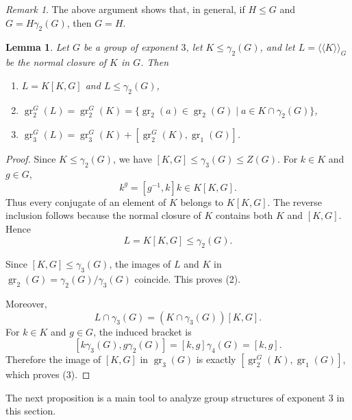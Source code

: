 \documentclass[11pt,reqno]{article}
\newtheorem{lemma}[theorem]{Lemma}
\theoremstyle{definition}
\theoremstyle{remark}
\newtheorem{remark}[theorem]{Remark}
\DeclareMathOperator{\gr}{gr}
\newcommand{\llangle}{\langle\!\langle}
\newcommand{\rrangle}{\rangle\!\rangle}
\begin{document}
\begin{remark}\label{remark:G=H}
    The above argument shows that, in general, if $H\leq G$ and $G=H\gamma_2(G)$, then $G=H$.
\end{remark}

\begin{lemma}\label{lemma:gr of normal closure}
    Let $G$ be a group of exponent $3$, let $K\leq\gamma_2(G)$, and let
    $L=\llangle K\rrangle_G$ be the normal closure of $K$ in $G$.
    Then
    \begin{enumerate}
        \item $L=K[K,G]$ and $L\leq \gamma_2(G)$,
        \item $\gr_2^G(L)=\gr_2^G(K)=\{\gr_2(a)\in \gr_2(G)\mid a\in K\cap \gamma_2(G)\}$,
        \item $\gr_3^G(L)=\gr_3^G(K)+[\gr_2^G(K),\gr_1(G)]$.
    \end{enumerate}
\end{lemma}

\begin{proof}
    Since $K\leq\gamma_2(G)$, we have
    $[K,G]\leq\gamma_3(G)\leq Z(G)$.  For $k\in K$ and $g\in G$,
    \[
    k^g=[g^{-1},k]k\in K[K,G].
    \]
    Thus every conjugate of an element of $K$ belongs to $K[K,G]$.  The
    reverse inclusion follows because the normal closure of $K$ contains both
    $K$ and $[K,G]$.  Hence
    \[
    L=K[K,G]\leq\gamma_2(G).
    \]

    Since $[K,G]\leq\gamma_3(G)$, the images of $L$ and $K$ in
    $\gr_2(G)=\gamma_2(G)/\gamma_3(G)$ coincide.  This proves (2).

    Moreover,
    \[
    L\cap\gamma_3(G)=(K\cap\gamma_3(G))[K,G].
    \]
    For $k\in K$ and $g\in G$, the induced bracket is
    \[
    [k\gamma_3(G),g\gamma_2(G)]
    =[k,g]\gamma_4(G)=[k,g].
    \]
    Therefore the image of $[K,G]$ in $\gr_3(G)$ is exactly
    $[\gr_2^G(K),\gr_1(G)]$, which proves (3).
\end{proof}
The next proposition is a main tool to analyze group structures of exponent $3$ in this section.
\end{document}
